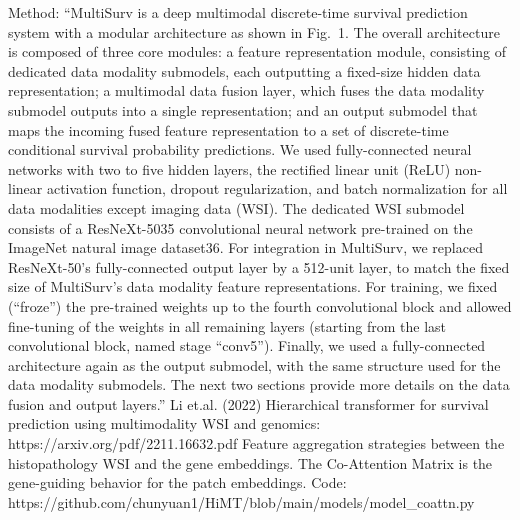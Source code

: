 \documentclass{article}%
\begin{document}
\newline%
\newline%
%
Method: “MultiSurv is a deep multimodal discrete{-}time survival prediction system with a modular architecture as shown in Fig.~1. The overall architecture is composed of three core modules: a feature representation module, consisting of dedicated data modality submodels, each outputting a fixed{-}size hidden data representation; a multimodal data fusion layer, which fuses the data modality submodel outputs into a single representation; and an output submodel that maps the incoming fused feature representation to a set of discrete{-}time conditional survival probability predictions. We used fully{-}connected neural networks with two to five hidden layers, the rectified linear unit (ReLU) non{-}linear activation function, dropout regularization, and batch normalization for all data modalities except imaging data (WSI). The dedicated WSI submodel consists of a ResNeXt{-}5035 convolutional neural network pre{-}trained on the ImageNet natural image dataset36. For integration in MultiSurv, we replaced ResNeXt{-}50’s fully{-}connected output layer by a 512{-}unit layer, to match the fixed size of MultiSurv’s data modality feature representations. For training, we fixed (“froze”) the pre{-}trained weights up to the fourth convolutional block and allowed fine{-}tuning of the weights in all remaining layers (starting from the last convolutional block, named stage “conv5”). Finally, we used a fully{-}connected architecture again as the output submodel, with the same structure used for the data modality submodels. The next two sections provide more details on the data fusion and output layers.”%
\newline%
\newline%
%
Li et.al. (2022) Hierarchical transformer for survival prediction using multimodality WSI and genomics:%
\newline%
\newline%
%
https://arxiv.org/pdf/2211.16632.pdf%
\newline%
\newline%
%
%
\newline%
\newline%
%
Feature aggregation strategies between the histopathology WSI and the gene embeddings. The Co{-}Attention Matrix is the gene{-}guiding behavior for the patch embeddings.%
\newline%
\newline%
%
Code: https://github.com/chunyuan1/HiMT/blob/main/models/model\_coattn.py %
\end{document}
